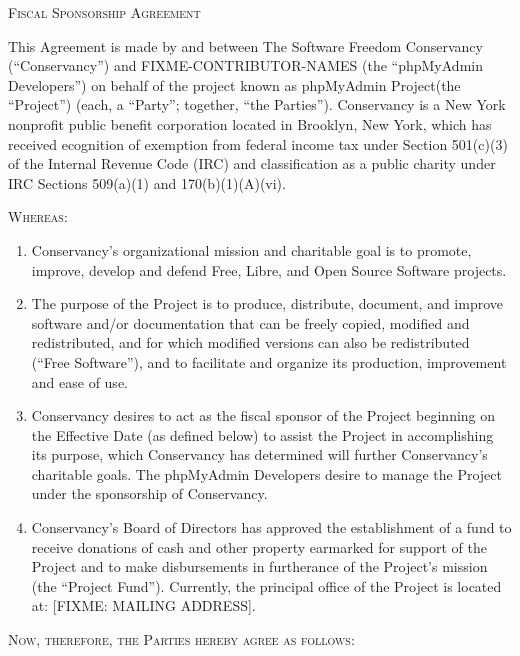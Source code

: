 \documentclass[letterpaper,12pt]{article}
\newcommand{\projectname}{phpMyAdmin Project\xspace}
\newcommand{\signatories}{phpMyAdmin Developers\xspace}
\begin{document}
\begin{center}
\textsc{\Huge Fiscal Sponsorship Agreement}{\Huge {} } 
\par\end{center}

\bigskip{}


This Agreement is made by and between The Software Freedom Conservancy
(``Conservancy'') and FIXME-CONTRIBUTOR-NAMES (the ``\signatories'')
on behalf of the project known as \projectname (the ``Project'') (each, a 
``Party''; together, ``the Parties'').  Conservancy is a New York nonprofit 
public benefit corporation located in Brooklyn, New York, which has received 
ecognition of exemption from federal income tax under Section 501(c)(3) of 
the Internal Revenue Code (IRC) and classification as a public charity under 
IRC Sections 509(a)(1) and 170(b)(1)(A)(vi).

\textsc{Whereas:}

\begin{enumerate}[label=\Alph*.,ref=\S \Alph*]
\item Conservancy's organizational mission and charitable goal is to promote,
improve, develop and defend Free, Libre, and Open Source Software
projects. 
\item The purpose of the Project is to produce, distribute, document, and
improve software and/or documentation that can be freely copied, modified and redistributed,
and for which modified versions can also be redistributed (``Free Software''),
and to facilitate and organize its production, improvement and ease
of use. 
\item Conservancy desires to act as the fiscal sponsor of the Project beginning
on the Effective Date (as defined below) to assist the Project in
accomplishing its purpose, which Conservancy has determined will further
Conservancy's charitable goals. The \signatories desire to manage
the Project under the sponsorship of Conservancy. 
\item Conservancy's Board of Directors has approved the establishment
of a fund to receive donations of cash and other property earmarked
for support of the Project and to make disbursements in furtherance
of the Project's mission (the ``Project Fund''). Currently, the
principal office of the Project is located at: [FIXME: MAILING ADDRESS]. 
\end{enumerate}
\medskip{}


\textsc{Now, therefore, the Parties hereby agree as follows:}
\end{document}
